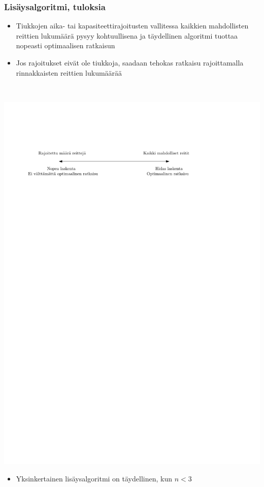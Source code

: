 \documentclass{beamer}
\begin{document}
    
    
    
    
    
    
    
    
        \begin{frame}
\frametitle{Lisäysalgoritmi, tuloksia}
 \begin{itemize}
\item
Tiukkojen aika- tai kapasiteettirajoitusten vallitessa kaikkien mahdollisten reittien lukumäärä pysyy kohtuullisena ja 
täydellinen algoritmi tuottaa nopeasti optimaalisen ratkaisun
\item
Jos rajoitukset eivät ole tiukkoja, saadaan tehokas ratkaisu
rajoittamalla rinnakkaisten reittien lukumäärää
\end{itemize}
\hfill \\
\begin{center}
\includegraphics[scale=0.7]{vskuva}
\end{center}
\begin{itemize}
 \item 
 Yksinkertainen lisäysalgoritmi on täydellinen, kun $n < 3$
\end{itemize}

\end{frame}
    
\end{document}
